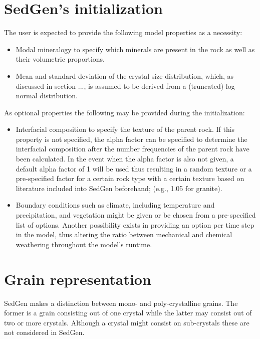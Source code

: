 \section{SedGen's initialization}
The user is expected to provide the following model properties as a necessity:
\begin{itemize}
    \item Modal mineralogy to specify which minerals are present in the rock as well as their volumetric proportions. %
    \item Mean and standard deviation of the crystal size distribution, which, as discussed in section ..., is assumed to be derived from a (truncated) log-normal distribution. %
\end{itemize}

As optional properties the following may be provided during the initialization:
\begin{itemize}
    \item Interfacial composition to specify the texture of the parent rock. %
    If this property is not specified, the alpha factor can be specified to determine the interfacial composition after the number frequencies of the parent rock have been calculated. %
    In the event when the alpha factor is also not given, a default alpha factor of 1 will be used thus resulting in a random texture or a pre-specified factor for a certain rock type with a certain texture based on literature included into SedGen beforehand; (e.g., 1.05 for granite). %
    \item Boundary conditions such as climate, including temperature and precipitation, and vegetation might be given or be chosen from a pre-specified list of options. %
    Another possibility exists in providing an option per time step in the model, thus altering the ratio between mechanical and chemical weathering throughout the model's runtime. %
\end{itemize}

\section{Grain representation}
SedGen makes a distinction between mono- and poly-crystalline grains. %
The former is a grain consisting out of one crystal while the latter may consist out of two or more crystals. %
Although a crystal might consist on sub-crystals these are not considered in SedGen. %


